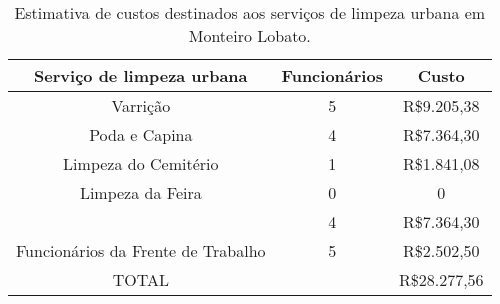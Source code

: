 \begin{center}
	\begin{table}
		\centering
		\caption{Estimativa de custos destinados aos serviços de limpeza urbana em Monteiro Lobato.}
		\label{tab:estimativa_limpeza_urbana}
		\begin{tabular}{c|c|c}
			\rowcolor[rgb]{ .969,  .588,  .275} \textbf{Serviço de limpeza urbana} & \textbf{Funcionários} & \multicolumn{1}{p{7em}}{\textbf{Custo}} \\
			\midrule
			\rowcolor[rgb]{ .992,  .914,  .851} Varrição & 5     & R\$9.205,38 \\
			\midrule
			\rowcolor[rgb]{ .976,  .737,  .541} Poda e Capina & 4     & R\$7.364,30 \\
			\midrule
			\rowcolor[rgb]{ .992,  .914,  .851} Limpeza do Cemitério & 1     & R\$1.841,08 \\
			\midrule
			\rowcolor[rgb]{ .976,  .737,  .541} Limpeza da Feira & 0     & 0 \\
			\midrule
			\rowcolor[rgb]{ .992,  .914,  .851} \multicolumn{1}{|c|}{Limpeza da Rede de drenagem} & 4     & \multicolumn{1}{c|}{R\$7.364,30} \\
			\midrule
			\rowcolor[rgb]{ .976,  .737,  .541} Funcionários da Frente de Trabalho & 5     & R\$2.502,50 \\
			\midrule
			\rowcolor[rgb]{ .992,  .914,  .851} TOTAL &       & R\$28.277,56 \\
		\end{tabular}%
		
	\end{table}
\end{center}